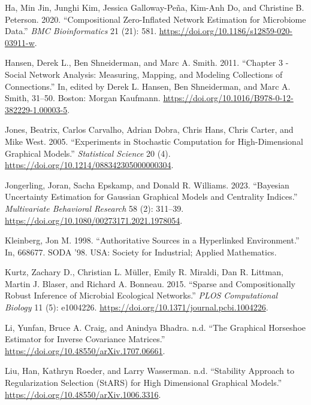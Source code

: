 \documentclass[
  letterpaper,
  DIV=11,
  numbers=noendperiod]{scrartcl}
\newlength{\cslhangindent}
\newlength{\cslentryspacingunit} %
\newenvironment{CSLReferences}[2] %
 {%
  \setlength{\parindent}{0pt}
  \ifodd #1
  \let\oldpar\par
  \def\par{\hangindent=\cslhangindent\oldpar}
  \fi
  \setlength{\parskip}{#2\cslentryspacingunit}
 }%
 {}
\begin{document}
\begin{CSLReferences}{1}{0}
\leavevmode{}%
Ha, Min Jin, Junghi Kim, Jessica Galloway-Peña, Kim-Anh Do, and
Christine B. Peterson. 2020. {``Compositional Zero-Inflated Network
Estimation for Microbiome Data.''} \emph{BMC Bioinformatics} 21 (21):
581. \url{https://doi.org/10.1186/s12859-020-03911-w}.

\leavevmode{}%
Hansen, Derek L., Ben Shneiderman, and Marc A. Smith. 2011. {``Chapter 3
- Social Network Analysis: Measuring, Mapping, and Modeling Collections
of Connections.''} In, edited by Derek L. Hansen, Ben Shneiderman, and
Marc A. Smith, 31--50. Boston: Morgan Kaufmann.
\url{https://doi.org/10.1016/B978-0-12-382229-1.00003-5}.

\leavevmode{}%
Jones, Beatrix, Carlos Carvalho, Adrian Dobra, Chris Hans, Chris Carter,
and Mike West. 2005. {``Experiments in Stochastic Computation for
High-Dimensional Graphical Models.''} \emph{Statistical Science} 20 (4).
\url{https://doi.org/10.1214/088342305000000304}.

\leavevmode{}%
Jongerling, Joran, Sacha Epskamp, and Donald R. Williams. 2023.
{``Bayesian Uncertainty Estimation for Gaussian Graphical Models and
Centrality Indices.''} \emph{Multivariate Behavioral Research} 58 (2):
311--39. \url{https://doi.org/10.1080/00273171.2021.1978054}.

\leavevmode{}%
Kleinberg, Jon M. 1998. {``Authoritative Sources in a Hyperlinked
Environment.''} In, 668677. SODA '98. USA: Society for Industrial;
Applied Mathematics.

\leavevmode{}%
Kurtz, Zachary D., Christian L. Müller, Emily R. Miraldi, Dan R.
Littman, Martin J. Blaser, and Richard A. Bonneau. 2015. {``Sparse and
Compositionally Robust Inference of Microbial Ecological Networks.''}
\emph{PLOS Computational Biology} 11 (5): e1004226.
\url{https://doi.org/10.1371/journal.pcbi.1004226}.

\leavevmode{}%
Li, Yunfan, Bruce A. Craig, and Anindya Bhadra. n.d. {``The Graphical
Horseshoe Estimator for Inverse Covariance Matrices.''}
\url{https://doi.org/10.48550/arXiv.1707.06661}.

\leavevmode{}%
Liu, Han, Kathryn Roeder, and Larry Wasserman. n.d. {``Stability
Approach to Regularization Selection (StARS) for High Dimensional
Graphical Models.''} \url{https://doi.org/10.48550/arXiv.1006.3316}.


\end{CSLReferences}
\end{document}
